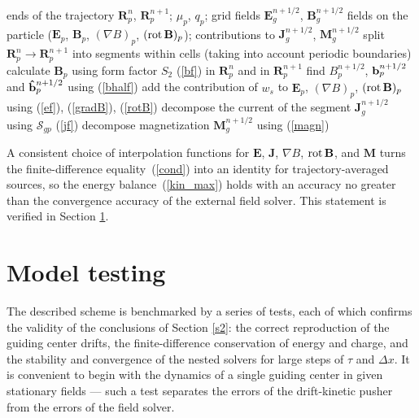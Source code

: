 \documentclass[final,3p]{elsarticle}
\newcommand{\rot}{\mbox{\rm{rot\,}}}
\begin{document}
\begin{algorithm}[H]
\caption{Field interpolation and source assembly for a single particle}
\label{alg:interp}
\begin{algorithmic}[1]
\Require ends of the trajectory $\mathbf{R}_p^n$, $\mathbf{R}_p^{n+1}$; $\mu_p$, $q_p$; grid fields $\mathbf{E}_g^{n+1/2}$, $\mathbf{B}_g^{n+1/2}$
\Ensure fields on the particle ($\mathbf{E}_p$, $\mathbf{B}_p$, $(\nabla B)_p$, $(\rot\mathbf{B})_p$); contributions to $\mathbf{J}_g^{n+1/2}$, $\mathbf{M}_g^{n+1/2}$
\State split $\mathbf{R}_p^n\to\mathbf{R}_p^{n+1}$ into segments within cells (taking into account periodic boundaries)
\State calculate $\mathbf{B}_p$ using form factor $S_2$ (\ref{bf}) in $\mathbf{R}_p^n$ and in $\mathbf{R}_p^{n+1}$
\State find $B_p^{n+1/2}$, ${\bf b}_p^{n+1/2}$ and ${\bf \hat{b}}_p^{n+1/2}$ using (\ref{bhalf})
    \State add the contribution of $w_s$ to $\mathbf{E}_p$, $(\nabla B)_p$, $(\rot\mathbf{B})_p$ using (\ref{ef}), (\ref{gradB}), (\ref{rotB})
    \State decompose the current of the segment $\mathbf{J}_g^{n+1/2}$ using $\mathbf{\mathcal{S}}_{gp}$ (\ref{jf})
\EndFor
\State decompose magnetization $\mathbf{M}_g^{n+1/2}$ using (\ref{magn})
\end{algorithmic}
\end{algorithm}

A consistent choice of interpolation functions for $\mathbf{E}$, $\mathbf{J}$, $\nabla B$, $\rot\mathbf{B}$, and $\mathbf{M}$ turns the finite-difference equality~(\ref{cond}) into an identity for trajectory-averaged sources, so the energy balance~(\ref{kin_max}) holds with an accuracy no greater than the convergence accuracy of the external field solver. This statement is verified in Section \ref{s4}.


\section{Model testing}\label{s4}

The described scheme is benchmarked by a series of tests, each of which confirms the validity of the conclusions of Section \ref{s2}: the correct reproduction of the guiding center drifts, the finite-difference conservation of energy and charge, and the stability and convergence of the nested solvers for large steps of $\tau$ and $\Delta x$. It is convenient to begin with the dynamics of a single guiding center in given stationary fields --- such a test separates the errors of the drift-kinetic pusher from the errors of the field solver.
\end{document}
